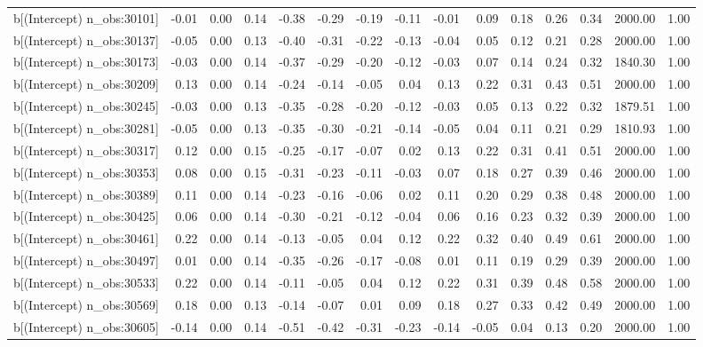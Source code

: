 \begin{table}[ht]
\begin{tabular}{rrrrrrrrrrrrrrr}
  b[(Intercept) n\_obs:30101] & -0.01 & 0.00 & 0.14 & -0.38 & -0.29 & -0.19 & -0.11 & -0.01 & 0.09 & 0.18 & 0.26 & 0.34 & 2000.00 & 1.00 \\ 
  b[(Intercept) n\_obs:30137] & -0.05 & 0.00 & 0.13 & -0.40 & -0.31 & -0.22 & -0.13 & -0.04 & 0.05 & 0.12 & 0.21 & 0.28 & 2000.00 & 1.00 \\ 
  b[(Intercept) n\_obs:30173] & -0.03 & 0.00 & 0.14 & -0.37 & -0.29 & -0.20 & -0.12 & -0.03 & 0.07 & 0.14 & 0.24 & 0.32 & 1840.30 & 1.00 \\ 
  b[(Intercept) n\_obs:30209] & 0.13 & 0.00 & 0.14 & -0.24 & -0.14 & -0.05 & 0.04 & 0.13 & 0.22 & 0.31 & 0.43 & 0.51 & 2000.00 & 1.00 \\ 
  b[(Intercept) n\_obs:30245] & -0.03 & 0.00 & 0.13 & -0.35 & -0.28 & -0.20 & -0.12 & -0.03 & 0.05 & 0.13 & 0.22 & 0.32 & 1879.51 & 1.00 \\ 
  b[(Intercept) n\_obs:30281] & -0.05 & 0.00 & 0.13 & -0.35 & -0.30 & -0.21 & -0.14 & -0.05 & 0.04 & 0.11 & 0.21 & 0.29 & 1810.93 & 1.00 \\ 
  b[(Intercept) n\_obs:30317] & 0.12 & 0.00 & 0.15 & -0.25 & -0.17 & -0.07 & 0.02 & 0.13 & 0.22 & 0.31 & 0.41 & 0.51 & 2000.00 & 1.00 \\ 
  b[(Intercept) n\_obs:30353] & 0.08 & 0.00 & 0.15 & -0.31 & -0.23 & -0.11 & -0.03 & 0.07 & 0.18 & 0.27 & 0.39 & 0.46 & 2000.00 & 1.00 \\ 
  b[(Intercept) n\_obs:30389] & 0.11 & 0.00 & 0.14 & -0.23 & -0.16 & -0.06 & 0.02 & 0.11 & 0.20 & 0.29 & 0.38 & 0.48 & 2000.00 & 1.00 \\ 
  b[(Intercept) n\_obs:30425] & 0.06 & 0.00 & 0.14 & -0.30 & -0.21 & -0.12 & -0.04 & 0.06 & 0.16 & 0.23 & 0.32 & 0.39 & 2000.00 & 1.00 \\ 
  b[(Intercept) n\_obs:30461] & 0.22 & 0.00 & 0.14 & -0.13 & -0.05 & 0.04 & 0.12 & 0.22 & 0.32 & 0.40 & 0.49 & 0.61 & 2000.00 & 1.00 \\ 
  b[(Intercept) n\_obs:30497] & 0.01 & 0.00 & 0.14 & -0.35 & -0.26 & -0.17 & -0.08 & 0.01 & 0.11 & 0.19 & 0.29 & 0.39 & 2000.00 & 1.00 \\ 
  b[(Intercept) n\_obs:30533] & 0.22 & 0.00 & 0.14 & -0.11 & -0.05 & 0.04 & 0.12 & 0.22 & 0.31 & 0.39 & 0.48 & 0.58 & 2000.00 & 1.00 \\ 
  b[(Intercept) n\_obs:30569] & 0.18 & 0.00 & 0.13 & -0.14 & -0.07 & 0.01 & 0.09 & 0.18 & 0.27 & 0.33 & 0.42 & 0.49 & 2000.00 & 1.00 \\ 
  b[(Intercept) n\_obs:30605] & -0.14 & 0.00 & 0.14 & -0.51 & -0.42 & -0.31 & -0.23 & -0.14 & -0.05 & 0.04 & 0.13 & 0.20 & 2000.00 & 1.00 \\ 

\end{tabular}
\end{table}
